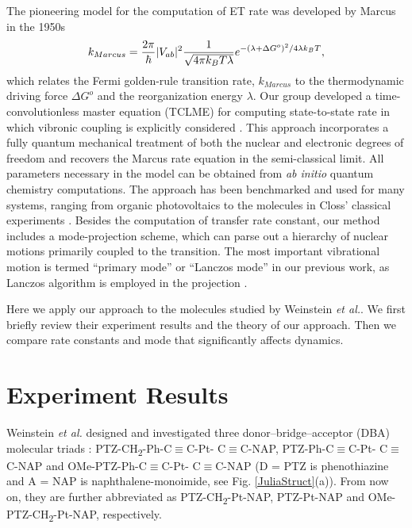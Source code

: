 The pioneering model for the computation of ET rate was developed by Marcus in the 1950s \cite{marcus1956theory,marcus1965theory,marcus1993electron}
\begin{equation}
k_{Marcus}=\frac{2\pi}{\hbar}|V_{ab}|^{2}\frac{1}{\sqrt{4\text{\ensuremath{\pi}}k_{B}T\lambda}}e^{-(\lambda+ \Delta G^{o})^{2}/4\text{\ensuremath{\lambda}}k_{B}T},
\end{equation}
which relates the Fermi golden-rule transition rate, $k_{Marcus}$
to the thermodynamic driving force $\Delta G^{o}$ and the reorganization energy $\lambda$. Our group developed a time-convolutionless  master equation (TCLME) for computing state-to-state rate in which vibronic coupling is explicitly considered \cite{pereverzev2006time}. This approach incorporates a fully quantum
mechanical treatment of both the nuclear and electronic degrees of freedom and recovers
the Marcus rate equation in the semi-classical limit.  All parameters necessary in the model can be obtained from {\em ab initio} quantum  chemistry computations.
The approach has been benchmarked and used for many systems, ranging from organic photovoltaics to the molecules in Closs' classical experiments \cite{tamura2008phonon,tamura2007exciton,singh2009fluorescence,bittner2014noise,yang2014intramolecular,yang2015computing}. Besides the computation of transfer rate constant, our method includes a  mode-projection scheme, which can parse out a hierarchy of nuclear motions primarily coupled to the transition. The most important vibrational motion is termed ``primary mode'' or ``Lanczos mode'' in our previous work, as Lanczos algorithm is employed in the projection \cite{yang2014intramolecular,yang2015computing}.

Here we apply our approach to the molecules studied by Weinstein {\em et al.}. We first briefly review their experiment results and the theory of our approach. Then we compare  rate constants and mode that significantly affects dynamics.


\section{Experiment Results}

Weinstein {\em et al.} designed and investigated three donor–bridge–acceptor (DBA) molecular triads \cite{delor2014toward,delor2015mechanism,scattergood2014electron}: PTZ-CH\textsubscript{2}-Ph-C$\equiv$C-Pt- C$\equiv$C-NAP, PTZ-Ph-C$\equiv$C-Pt- C$\equiv$C-NAP and OMe-PTZ-Ph-C$\equiv$C-Pt- C$\equiv$C-NAP (D = PTZ is phenothiazine and A = NAP is naphthalene-monoimide, see Fig. \ref{JuliaStruct}(a)). From now on, they are further abbreviated as PTZ-CH\textsubscript{2}-Pt-NAP, PTZ-Pt-NAP and OMe-PTZ-CH\textsubscript{2}-Pt-NAP, respectively.

